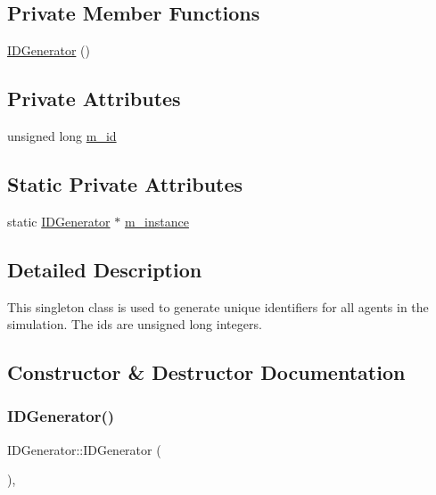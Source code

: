 \subsection*{Private Member Functions}
\begin{DoxyCompactItemize}
\item 
\mbox{\hyperlink{class_i_d_generator_a8209b55f50b469c47f977660a769b1da}{I\+D\+Generator}} ()
\end{DoxyCompactItemize}
\subsection*{Private Attributes}
\begin{DoxyCompactItemize}
\item 
unsigned long \mbox{\hyperlink{class_i_d_generator_ad0400380525f694b23ff675f4f170893}{m\+\_\+id}}
\end{DoxyCompactItemize}
\subsection*{Static Private Attributes}
\begin{DoxyCompactItemize}
\item 
static \mbox{\hyperlink{class_i_d_generator}{I\+D\+Generator}} $\ast$ \mbox{\hyperlink{class_i_d_generator_a316bacdda67f4cf9bf73fcbd9bf94245}{m\+\_\+instance}}
\end{DoxyCompactItemize}


\subsection{Detailed Description}
This singleton class is used to generate unique identifiers for all agents in the simulation. The ids are unsigned long integers. 

\subsection{Constructor \& Destructor Documentation}
\mbox{\label{class_i_d_generator_a8209b55f50b469c47f977660a769b1da}} 
\subsubsection{\texorpdfstring{IDGenerator()}{IDGenerator()}}
{\footnotesize\ttfamily I\+D\+Generator\+::\+I\+D\+Generator (\begin{DoxyParamCaption}{ }\end{DoxyParamCaption})\hspace{0.3cm}{\ttfamily [inline]}, {\ttfamily [private]}}



